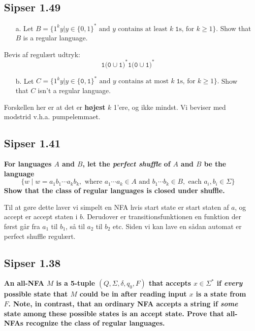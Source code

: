 \subsection*{Sipser 1.49}%
\label{subsec:sipser1.49}

\begin{enumerate}
  \item[a.] Let  $B = \{1^{k}y | y \in \{0,1\}^{*} \text{ and } y \text{ contains at least } k \;\mathtt{ 1} \text{s, for } k \ge 1\}$. Show that $B$ is a regular language.
\end{enumerate}

Bevis af regulært udtryk:
\[  \mathtt{1(0} \cup \mathtt{1)}^{*} \mathtt{1(0} \cup \mathtt{1)}^{*} \]

\begin{enumerate}
  \item[b.] Let $C = \{1^{k}y | y \in \{\mathtt{0,1}\}^{*} \text{ and } y \text{ contains at most }k \;\mathtt{1} \text{s, for } k \ge 1\}.$
        Show that $C$ isn't a regular language.
\end{enumerate}

Forskellen her er at det er \textbf{højest} $k$ 1'ere, og ikke mindst.
Vi beviser med modstrid v.h.a. pumpelemmaet.


\subsection*{Sipser 1.41}%
\label{subsec:sipser1.41}
\textbf{For languages $A$ and $B$, let the \textit{perfect shuffle} of $A$ and $B$ be the language}
\[ \{w \; | \; w = a_{1}b_{1} \cdots a_{k}b_{k}, \text{ where } a_{1} \cdots a_{k} \in A \text{ and }b_{1} \cdots b_{k} \in B, \text{ each }a_{i}, b_{i} \in \Sigma\} \]
\textbf{Show that the class of regular languages is closed under shuffle.}

Til at gøre dette laver vi simpelt en NFA hvis start state er start staten af $a$, og accept er accept staten i $b$. Derudover er transitionsfunktionen en funktion der først går fra $a_{1}$ til $b_{1}$, så til $a_{2}$ til $b_{2}$ etc. Siden vi kan lave en sådan automat er perfect shuffle regulært.

\subsection*{Sipser 1.38}%
\label{subsec:sipser1.38}

\textbf{An all-NFA $M$ is a 5-tuple $(Q, \Sigma, \delta, q_{0}, F)$ that accepts $x \in \Sigma^{*}$ if \textit{every} possible state that $M$ could be in after reading input $x$ is a state from $F$. Note, in contrast, that an ordinary   NFA accepts a string if \textit{some} state among these possible states is an accept state. Prove that all-NFAs recognize the class of regular languages.}

